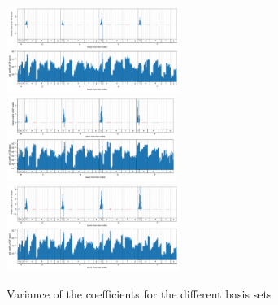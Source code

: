 \begin{figure}
        \includegraphics[width=0.5\textwidth]{chapters/results/results_images/var_coeffsfitted_basis_2.5}
        \includegraphics[width=0.49\textwidth]{chapters/results/results_images/var_coeffsfitted_regularized_basis_3.0}
        \includegraphics[width=0.5\textwidth]{chapters/results/results_images/var_coeffsfitted_regularized_basis_2.5}
    \caption{Variance of the coefficients for the different basis sets}
\end{figure}